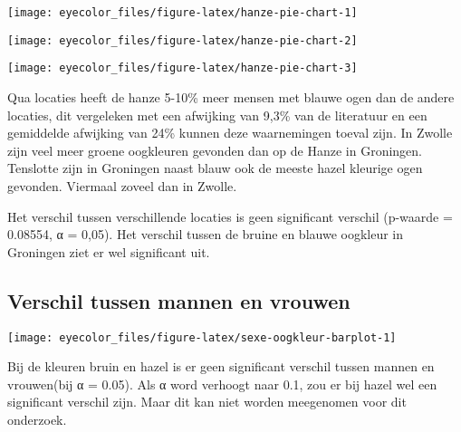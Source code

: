 \documentclass[
]{article}
\let\origfigure\figure
\let\endorigfigure\endfigure
\renewenvironment{figure}[1][2] {
    \expandafter\origfigure\expandafter[H]
} {
    \endorigfigure
}
\begin{document}
\begin{figure}
\texttt{[image: eyecolor\_files/figure-latex/hanze-pie-chart-1]} \caption{Taart grafiek die de verdeling van de oogkleur op de Hanze Hogeschool Groningen weergeeft.}\label{fig:hanze-pie-chart-1}
\end{figure}
\begin{figure}
\texttt{[image: eyecolor\_files/figure-latex/hanze-pie-chart-2]} \caption{Taart grafiek die de verdeling van de oogkleur op de Hanze Hogeschool Groningen weergeeft.}\label{fig:hanze-pie-chart-2}
\end{figure}
\begin{figure}
\texttt{[image: eyecolor\_files/figure-latex/hanze-pie-chart-3]} \caption{Taart grafiek die de verdeling van de oogkleur op de Hanze Hogeschool Groningen weergeeft.}\label{fig:hanze-pie-chart-3}
\end{figure}

Qua locaties heeft de hanze 5-10\% meer mensen met blauwe ogen dan de
andere locaties, dit vergeleken met een afwijking van 9,3\% van de
literatuur en een gemiddelde afwijking van 24\% kunnen deze waarnemingen
toeval zijn. In Zwolle zijn veel meer groene oogkleuren gevonden dan op
de Hanze in Groningen. Tenslotte zijn in Groningen naast blauw ook de
meeste hazel kleurige ogen gevonden. Viermaal zoveel dan in Zwolle.

Het verschil tussen verschillende locaties is geen significant verschil
(p-waarde = 0.08554, α = 0,05). Het verschil tussen de bruine en blauwe
oogkleur in Groningen ziet er wel significant uit.

\hypertarget{verschil-tussen-mannen-en-vrouwen}{%
\subsection{Verschil tussen mannen en vrouwen}\label{verschil-tussen-mannen-en-vrouwen}}

\begin{figure}
\texttt{[image: eyecolor\_files/figure-latex/sexe-oogkleur-barplot-1]} \caption{Aantallen per oogkleur en geslacht: In deze barplot is per geslacht weergegeven hoe vaak een oogkleur is gemeten}\label{fig:sexe-oogkleur-barplot}
\end{figure}

Bij de kleuren bruin en hazel is er geen significant verschil tussen
mannen en vrouwen(bij α = 0.05). Als α word verhoogt naar 0.1, zou er
bij hazel wel een significant verschil zijn. Maar dit kan niet worden
meegenomen voor dit onderzoek.
\end{document}
